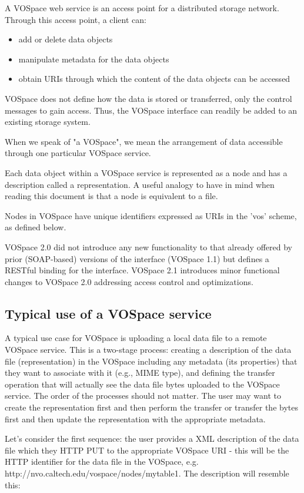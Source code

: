 \documentclass[11pt,a4paper]{ivoa}
\begin{document}
A VOSpace web service is an access point for a distributed storage network. Through this access point, a client can:

\begin{itemize}
    \item add or delete data objects
    \item manipulate metadata for the data objects
    \item obtain URIs through which the content of the data objects can be accessed
\end{itemize}
VOSpace does not define how the data is stored or transferred, only the control messages to gain access. Thus, the VOSpace interface can readily be added to an existing storage system.

When we speak of "a VOSpace", we mean the arrangement of data accessible through one particular VOSpace service.

Each data object within a VOSpace service is represented as a node and has a description called a representation. A useful analogy to have in mind when reading this document is that a node is equivalent to a file.

Nodes in VOSpace have unique identifiers expressed as URIs in the 'vos' scheme, as defined below.

VOSpace 2.0 did not introduce any new functionality to that already offered by prior (SOAP-based) versions of the interface (VOSpace 1.1) but defines a RESTful binding for the interface. VOSpace 2.1 introduces minor functional changes to VOSpace 2.0 addressing access control and optimizations.

\subsection{Typical use of a VOSpace service}
A typical use case for VOSpace is uploading a local data file to a remote VOSpace service. This is a two-stage process: creating a description of the data file (representation) in the VOSpace including any metadata (its properties) that they want to associate with it (e.g., MIME type), and defining the transfer operation that will actually see the data file bytes uploaded to the VOSpace service. The order of the processes should not matter. The user may want to create the representation first and then perform the transfer or transfer the bytes first and then update the representation with the appropriate metadata.

Let's consider the first sequence: the user provides a XML description of the data file which they HTTP PUT to the appropriate VOSpace URI - this will be the HTTP identifier for the data file in the VOSpace, e.g. http://nvo.caltech.edu/vospace/nodes/mytable1. The description will resemble this:
\end{document}
